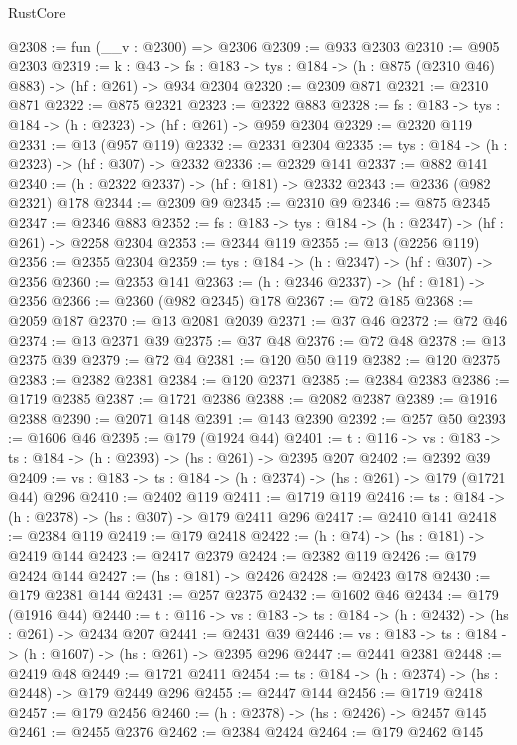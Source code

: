 \begin{lexlean}{RustCore}
\begin{coremodule}
@2308 := fun (__v : @2300) => @2306
@2309 := @933 @2303
@2310 := @905 @2303
@2319 := {k : @43} ->
  {fs : @183} -> {tys : @184} -> (h : @875 (@2310 @46) @883) -> (hf : @261) -> @934 @2304
@2320 := @2309 @871
@2321 := @2310 @871
@2322 := @875 @2321
@2323 := @2322 @883
@2328 := {fs : @183} -> {tys : @184} -> (h : @2323) -> (hf : @261) -> @959 @2304
@2329 := @2320 @119
@2331 := @13 (@957 @119)
@2332 := @2331 @2304
@2335 := {tys : @184} -> (h : @2323) -> (hf : @307) -> @2332
@2336 := @2329 @141
@2337 := @882 @141
@2340 := (h : @2322 @2337) -> (hf : @181) -> @2332
@2343 := @2336 (@982 @2321) @178
@2344 := @2309 @9
@2345 := @2310 @9
@2346 := @875 @2345
@2347 := @2346 @883
@2352 := {fs : @183} -> {tys : @184} -> (h : @2347) -> (hf : @261) -> @2258 @2304
@2353 := @2344 @119
@2355 := @13 (@2256 @119)
@2356 := @2355 @2304
@2359 := {tys : @184} -> (h : @2347) -> (hf : @307) -> @2356
@2360 := @2353 @141
@2363 := (h : @2346 @2337) -> (hf : @181) -> @2356
@2366 := @2360 (@982 @2345) @178
@2367 := @72 @185
@2368 := @2059 @187
@2370 := @13 @2081 @2039
@2371 := @37 @46
@2372 := @72 @46
@2374 := @13 @2371 @39
@2375 := @37 @48
@2376 := @72 @48
@2378 := @13 @2375 @39
@2379 := @72 @4
@2381 := @120 @50 @119
@2382 := @120 @2375
@2383 := @2382 @2381
@2384 := @120 @2371
@2385 := @2384 @2383
@2386 := @1719 @2385
@2387 := @1721 @2386
@2388 := @2082 @2387
@2389 := @1916 @2388
@2390 := @2071 @148
@2391 := @143 @2390
@2392 := @257 @50
@2393 := @1606 @46
@2395 := @179 (@1924 @44)
@2401 := {t : @116} -> {vs : @183} -> {ts : @184} -> (h : @2393) -> (hs : @261) -> @2395 @207
@2402 := @2392 @39
@2409 := {vs : @183} -> {ts : @184} -> (h : @2374) -> (hs : @261) -> @179 (@1721 @44) @296
@2410 := @2402 @119
@2411 := @1719 @119
@2416 := {ts : @184} -> (h : @2378) -> (hs : @307) -> @179 @2411 @296
@2417 := @2410 @141
@2418 := @2384 @119
@2419 := @179 @2418
@2422 := (h : @74) -> (hs : @181) -> @2419 @144
@2423 := @2417 @2379
@2424 := @2382 @119
@2426 := @179 @2424 @144
@2427 := (hs : @181) -> @2426
@2428 := @2423 @178
@2430 := @179 @2381 @144
@2431 := @257 @2375
@2432 := @1602 @46
@2434 := @179 (@1916 @44)
@2440 := {t : @116} -> {vs : @183} -> {ts : @184} -> (h : @2432) -> (hs : @261) -> @2434 @207
@2441 := @2431 @39
@2446 := {vs : @183} -> {ts : @184} -> (h : @1607) -> (hs : @261) -> @2395 @296
@2447 := @2441 @2381
@2448 := @2419 @48
@2449 := @1721 @2411
@2454 := {ts : @184} -> (h : @2374) -> (hs : @2448) -> @179 @2449 @296
@2455 := @2447 @144
@2456 := @1719 @2418
@2457 := @179 @2456
@2460 := (h : @2378) -> (hs : @2426) -> @2457 @145
@2461 := @2455 @2376
@2462 := @2384 @2424
@2464 := @179 @2462 @145

\end{coremodule}
\end{lexlean}
